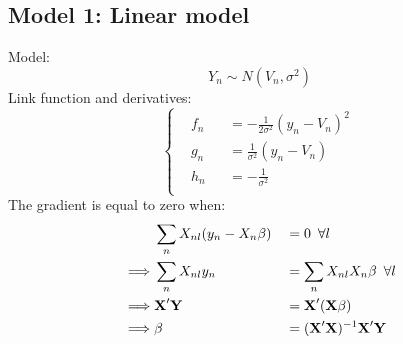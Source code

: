 \documentclass[12pt]{article}
\begin{document}
\subsection{Model 1: Linear model}
Model:
\begin{equation}
	Y_n \sim N(V_n, \sigma^2)
\end{equation}
Link function and derivatives:
\begin{equation}
\left\{ \begin{aligned}
	& f_n && = -\frac{1}{2 \sigma^2} (y_n -V_n)^2 \ \\
	& g_n && =  \frac{1}{\sigma^2} (y_n -V_n) \\
	& h_n && =  -\frac{1}{\sigma^2} \\
\end{aligned} \right.
\end{equation}
The gradient is equal to zero when:
\begin{equation}
\begin{aligned}
	&\sum_n X_{nl} (y_n - X_n \beta) && = 0 \hspace*{5pt} \forall l  \\
	\implies & \sum_n X_{nl} y_n && = \sum_n X_{nl} X_n \beta \hspace*{5pt} \forall l  \\
	\implies & \textbf{X}' \textbf{Y} && = \textbf{X}'(\textbf{X} \beta) \\
	\implies & \beta && =  (\textbf{X}'\textbf{X})^{-1} \textbf{X}' \textbf{Y} \\
\end{aligned}
\end{equation}
\end{document}
